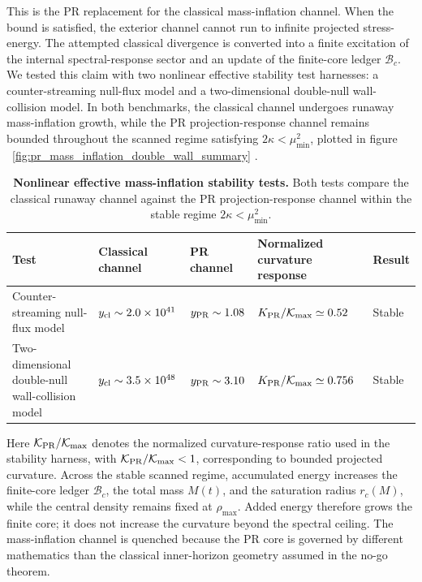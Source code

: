 \documentclass[11pt]{article}
\renewcommand{\arraystretch}{1.22}
\renewcommand{\arraystretch}{1.4}
\begin{document}
This is the PR replacement for the classical mass-inflation channel. When the 
bound is satisfied, the exterior channel cannot run to infinite projected 
stress-energy. The attempted classical divergence is converted into a finite 
excitation of the internal spectral-response sector and an update of the 
finite-core ledger \(\mathcal B_c\). We tested this claim with two nonlinear effective stability test harnesses: a counter-streaming null-flux model and a two-dimensional double-null wall-collision model. In both benchmarks, the classical channel undergoes runaway mass-inflation growth, while the PR projection-response channel remains bounded throughout the scanned regime satisfying \(2\kappa<\mu_{\min}^2\), plotted in figure ~\ref{fig:pr_mass_inflation_double_wall_summary} .

\begin{table}[H]
\centering
\renewcommand{\arraystretch}{1.18}
\footnotesize
\caption{
\label{tab:mass_inflation_stability_tests}
\textbf{Nonlinear effective mass-inflation stability tests.}
Both tests compare the classical runaway channel against the PR projection-response channel within the stable regime \(2\kappa<\mu_{\min}^2\).
}
\begin{tabular}{@{} p{} p{} p{} p{} p{} @{}}
\toprule
\textbf{Test} &
\textbf{Classical channel} &
\textbf{PR channel} &
\textbf{Normalized curvature response} &
\textbf{Result} \\
\midrule
Counter-streaming null-flux model &
\(y_{\rm cl}\sim2.0\times10^{41}\) &
\(y_{\rm PR}\sim1.08\) &
\(K_{\rm PR}/\mathcal K_{\max}\simeq0.52\) &
Stable \\
\addlinespace
Two-dimensional double-null wall-collision model &
\(y_{\rm cl}\sim3.5\times10^{48}\) &
\(y_{\rm PR}\sim3.10\) &
\(K_{\rm PR}/\mathcal K_{\max}\simeq0.756\) &
Stable \\
\bottomrule
\end{tabular}
\captionsetup{font=footnotesize}
\end{table}

Here \(\mathcal K_{\rm PR}/\mathcal K_{\max}\) denotes the normalized 
curvature-response ratio used in the stability harness, with $\mathcal K_{\rm PR}/\mathcal K_{\max}<1$,
corresponding to bounded projected curvature. Across the stable scanned regime, accumulated energy increases the finite-core ledger \(\mathcal B_c\), the total mass \(M(t)\), and the saturation radius \(r_c(M)\), while the central density remains fixed at \(\rho_{\max}\). Added energy therefore grows the finite core; it does not increase the curvature beyond the spectral ceiling. The mass-inflation channel is quenched because the PR core is governed by different mathematics than the classical inner-horizon geometry assumed in the no-go theorem.
\end{document}
